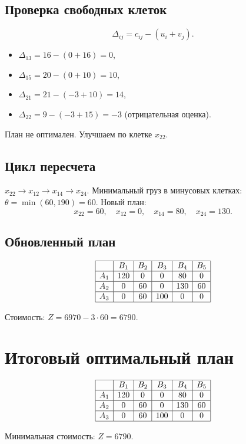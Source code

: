 \documentclass{article}
\begin{document}
\subsection{Проверка свободных клеток}
\[
\Delta_{ij} = c_{ij} - (u_i + v_j).
\]

\begin{itemize}
\item \( \Delta_{13} = 16 - (0 + 16) = 0 \),
\item \( \Delta_{15} = 20 - (0 + 10) = 10 \),
\item \( \Delta_{21} = 21 - (-3 + 10) = 14 \),
\item \( \Delta_{22} = 9 - (-3 + 15) = -3 \) (отрицательная оценка).
\end{itemize}

План не оптимален. Улучшаем по клетке \( x_{22} \).

\subsection{Цикл пересчета}
\( x_{22} \rightarrow x_{12} \rightarrow x_{14} \rightarrow x_{24} \).  
Минимальный груз в минусовых клетках: \( \theta = \min(60, 190) = 60 \).  
Новый план:
\[
x_{22} = 60, \quad x_{12} = 0, \quad x_{14} = 80, \quad x_{24} = 130.
\]

\subsection{Обновленный план}
\[
\begin{array}{|c|c|c|c|c|c|}
\hline
 & B_1 & B_2 & B_3 & B_4 & B_5 \\
\hline
A_1 & 120 & 0 & 0 & 80 & 0 \\
\hline
A_2 & 0 & 60 & 0 & 130 & 60 \\
\hline
A_3 & 0 & 60 & 100 & 0 & 0 \\
\hline
\end{array}
\]

Стоимость: \( Z = 6970 - 3 \cdot 60 = 6790 \).

\section{Итоговый оптимальный план}

\[
\begin{array}{|c|c|c|c|c|c|}
\hline
 & B_1 & B_2 & B_3 & B_4 & B_5 \\
\hline
A_1 & 120 & 0 & 0 & 80 & 0 \\
\hline
A_2 & 0 & 60 & 0 & 130 & 60 \\
\hline
A_3 & 0 & 60 & 100 & 0 & 0 \\
\hline
\end{array}
\]

Минимальная стоимость: \( Z = 6790 \).
\end{document}
